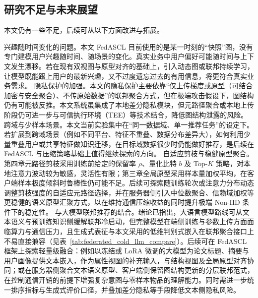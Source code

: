 \subsection{研究不足与未来展望}
\label{sec:outlook}
本文仍有一些不足，后续可从以下方面改进与拓展。
\begin{cnenumerate}
    \cnitem 兴趣随时间变化的问题。本文 FedASCL 目前使用的是某一时刻的“快照”图，没有专门建模用户兴趣随时间、随场景的变化。真实业务中用户偏好可能随时间与上下文发生漂移。若在现有双视图与原型对齐的基础上，引入动态图或联邦持续学习，让模型既能跟上用户的最新兴趣，又不过度遗忘过去的有用信息，将更符合真实业务需求。
    \cnitem 隐私保护的加强。本文的隐私保护主要依靠“仅上传梯度或原型（可结合加密与安全聚合）、不传原始数据”的联邦聚合方式，但在极端攻击假设下，图结构仍有可能被反推。本文系统虽集成了本地差分隐私模块，但元路径聚合或本地上传阶段仍可进一步与可信执行环境（TEE）等技术结合，降低图结构泄露的风险。
    \cnitem 跨域与少样本场景。本文当前实验集中在“同一数据域、单一推荐任务”的设定下。若扩展到跨域场景（例如不同平台、特征不重叠、数据分布差异大），如何利用少量重叠用户或共享特征做知识迁移，在目标域数据很少时仍能做好推荐，是后续在 FedASCL 与压缩策略基础上值得继续探索的方向。
    \cnitem 自适应剪枝与稳健原型聚合。第四章元路径剪枝采用训练前给定的保留率 $\rho$、量化比特 $b$ 及 Top-$K$ 策略，对本地注意力波动较为敏感，灵活性有限；第三章全局原型采用样本量加权平均，在客户端样本极度倾斜时鲁棒性仍可能不足。后续可探索随训练轮次或注意力分布动态调整剪枝强度的自适应元路径选择，并在服务器侧引入中位数聚合、信赖域加权等更稳健的语义原型汇聚方式，以在维持通信压缩收益的同时提升极端 Non-IID 条件下的稳定性。
    \cnitem 与大模型联邦推荐的结合。绪论已指出，大语言模型路线可从文本语义与预训练知识侧缓解联邦冷启动，但完整模型在端侧训练与参数上传方面面临算力与通信压力，且生成式表征与本文采用的低维判别式嵌入在联邦聚合接口上不易直接兼容（见表~\ref{tab:federated_cold_llm_compare}）。后续可在 FedASCL 框架上探索轻量级融合：例如以冻结或 LoRA 微调的大模型为论文标题、摘要与用户画像提供文本嵌入，作为属性视图的补充输入，与结构视图及全局原型对齐协同；或在服务器侧聚合文本语义原型、客户端侧保留图结构更新的分层联邦范式，在控制通信开销的前提下增强复杂意图与零样本物品的理解能力。同时需进一步统一排序指标与生成式评价口径，并叠加差分隐私等手段降低文本侧隐私风险。
\end{cnenumerate}
